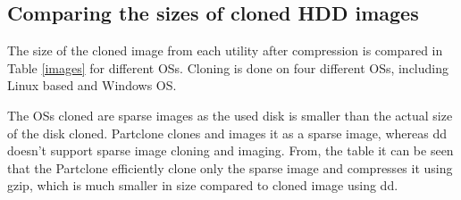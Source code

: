 \documentclass[a4paper,12pt]{article}
\begin{document}
\subsection{ Comparing the sizes of cloned HDD images}

The size of the cloned image from each utility after compression is compared in Table \ref{images} for different OSs. Cloning is done on four different OSs, including Linux based and Windows OS. 

The OSs cloned are sparse images as the used disk is smaller than the actual size of the disk cloned. Partclone clones and images it as a sparse image, whereas dd doesn't support sparse image cloning and imaging. From, the table it can be seen that the Partclone efficiently clone only the sparse image and compresses it using gzip, which is much smaller in size compared to cloned image using dd.
\end{document}
